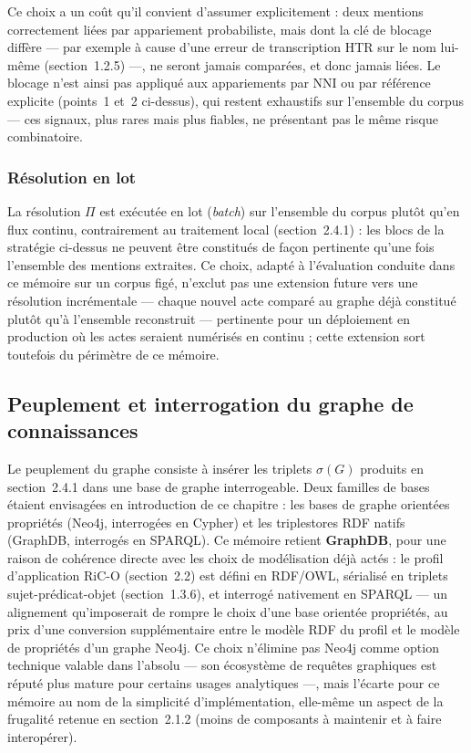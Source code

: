 Ce choix a un coût qu'il convient d'assumer explicitement : deux mentions correctement liées par appariement probabiliste, mais dont la clé de blocage diffère --- par exemple à cause d'une erreur de transcription HTR sur le nom lui-même (section~1.2.5) ---, ne seront jamais comparées, et donc jamais liées.
Le blocage n'est ainsi pas appliqué aux appariements par NNI ou par référence explicite (points~1 et~2 ci-dessus), qui restent exhaustifs sur l'ensemble du corpus --- ces signaux, plus rares mais plus fiables, ne présentant pas le même risque combinatoire.

\subsubsection*{Résolution en lot}

La résolution $\Pi$ est exécutée en lot (\textit{batch}) sur l'ensemble du corpus plutôt qu'en flux continu, contrairement au traitement local (section~2.4.1) : les blocs de la stratégie ci-dessus ne peuvent être constitués de façon pertinente qu'une fois l'ensemble des mentions extraites.
Ce choix, adapté à l'évaluation conduite dans ce mémoire sur un corpus figé, n'exclut pas une extension future vers une résolution incrémentale --- chaque nouvel acte comparé au graphe déjà constitué plutôt qu'à l'ensemble reconstruit --- pertinente pour un déploiement en production où les actes seraient numérisés en continu ; cette extension sort toutefois du périmètre de ce mémoire.

\subsection{Peuplement et interrogation du graphe de connaissances}

Le peuplement du graphe consiste à insérer les triplets $\sigma(G)$ produits en section~2.4.1 dans une base de graphe interrogeable.
Deux familles de bases étaient envisagées en introduction de ce chapitre : les bases de graphe orientées propriétés (Neo4j, interrogées en Cypher) et les triplestores RDF natifs (GraphDB, interrogés en SPARQL).
Ce mémoire retient \textbf{GraphDB}, pour une raison de cohérence directe avec les choix de modélisation déjà actés : le profil d'application RiC-O (section~2.2) est défini en RDF/OWL, sérialisé en triplets sujet-prédicat-objet (section~1.3.6), et interrogé nativement en SPARQL --- un alignement qu'imposerait de rompre le choix d'une base orientée propriétés, au prix d'une conversion supplémentaire entre le modèle RDF du profil et le modèle de propriétés d'un graphe Neo4j.
Ce choix n'élimine pas Neo4j comme option technique valable dans l'absolu --- son écosystème de requêtes graphiques est réputé plus mature pour certains usages analytiques ---, mais l'écarte pour ce mémoire au nom de la simplicité d'implémentation, elle-même un aspect de la frugalité retenue en section~2.1.2 (moins de composants à maintenir et à faire interopérer).

